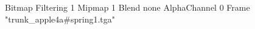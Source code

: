 {Bitmap
	{Filtering 1}
	{Mipmap 1}
	{Blend none}
	{AlphaChannel 0}
	{Frame "trunk_apple4a#spring1.tga"}
}
